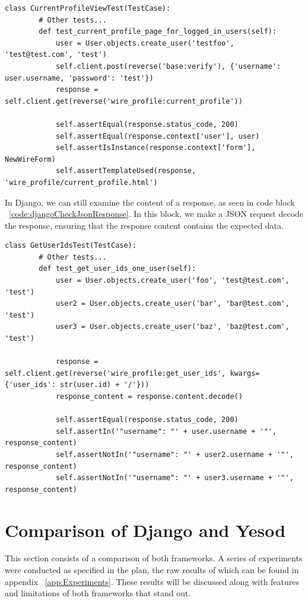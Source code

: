 \begin{lstlisting}[caption={Django current profile test},label={code:djangoCurrentProfileTest}]
	class CurrentProfileViewTest(TestCase):
		# Other tests...
		def test_current_profile_page_for_logged_in_users(self):
			user = User.objects.create_user('testfoo', 'test@test.com', 'test')
			self.client.post(reverse('base:verify'), {'username': user.username, 'password': 'test'})
			response = self.client.get(reverse('wire_profile:current_profile'))

			self.assertEqual(response.status_code, 200)
			self.assertEqual(response.context['user'], user)
			self.assertIsInstance(response.context['form'], NewWireForm)
			self.assertTemplateUsed(response, 'wire_profile/current_profile.html')
\end{lstlisting}

In Django, we can still examine the content of a response, as seen in code block ~\ref{code:djangoCheckJsonResponse}.
In this block, we make a JSON request decode the response, ensuring that the response
content contains the expected data.

\begin{lstlisting}[caption={Django checking a JSON response test},label={code:djangoCheckJsonResponse}]
	class GetUserIdsTest(TestCase):
		# Other tests...
		def test_get_user_ids_one_user(self):
			user = User.objects.create_user('foo', 'test@test.com', 'test')
			user2 = User.objects.create_user('bar', 'bar@test.com', 'test')
			user3 = User.objects.create_user('baz', 'baz@test.com', 'test')

			response = self.client.get(reverse('wire_profile:get_user_ids', kwargs={'user_ids': str(user.id) + '/'}))
			response_content = response.content.decode()

			self.assertEqual(response.status_code, 200)
			self.assertIn('"username": "' + user.username + '"', response_content)
			self.assertNotIn('"username": "' + user2.username + '"', response_content)
			self.assertNotIn('"username": "' + user3.username + '"', response_content)
\end{lstlisting}

\section{Comparison of Django and Yesod}

This section consists of a comparison of both frameworks. A series of experiments
were conducted as specified in the plan, the raw results of which can be found
in appendix ~\ref{app:Experiments}. These results will be discussed along with
features and limitations of both frameworks that stand out.

